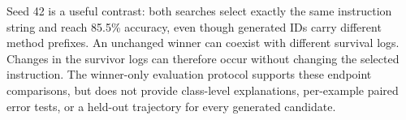 Seed 42 is a useful contrast: both searches select exactly the same instruction
string and reach 85.5\% accuracy, even though generated IDs carry different method
prefixes. An unchanged winner can coexist with different survival logs. Changes in the survivor logs can therefore occur without changing the
selected instruction. The winner-only evaluation protocol supports these endpoint
comparisons, but does not provide class-level explanations, per-example paired
error tests, or a held-out trajectory for every generated candidate.
